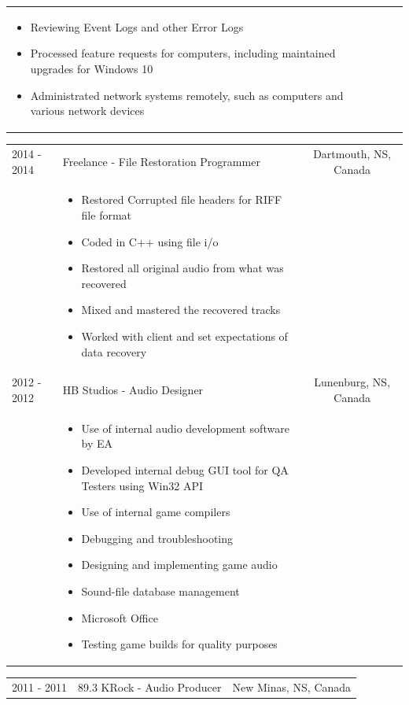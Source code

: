 \documentclass{res}
\newcommand{\frstCVcell}{2.5cm}
\begin{document}
\begin{resume}
\begin{tabularx}{\textwidth}{p{\frstCVcell}Xc}
\begin{itemize}
    \item Reviewing Event Logs and other Error Logs
    \item Processed feature requests for computers, including maintained upgrades for Windows 10
    \item Administrated network systems remotely, such as computers and various network devices
    \end{itemize}
    & \\
    \end{tabularx}
    \begin{tabularx}{\textwidth}{p{\frstCVcell}Xc}
    2014 - 2014 & Freelance - File Restoration Programmer & Dartmouth, NS, Canada\\
    &
    \begin{itemize}
    \item Restored Corrupted file headers for RIFF file format
    \item Coded in C++ using file i/o
    \item Restored all original audio from what was recovered
    \item Mixed and mastered the recovered tracks
    \item Worked with client and set expectations of data recovery
    \end{itemize}
    & \\
    2012 - 2012 & HB Studios - Audio Designer & Lunenburg, NS, Canada\\
    &
    \begin{itemize}
    \item Use of internal audio development software by EA
    \item Developed internal debug GUI tool for QA Testers using Win32 API
    \item Use of internal game compilers
    \item Debugging and troubleshooting
    \item Designing and implementing game audio
    \item Sound-file database management
    \item Microsoft Office
    \item Testing game builds for quality purposes
    \end{itemize}
    & \\
    \end{tabularx}
    \begin{tabularx}{\textwidth}{p{\frstCVcell}Xc}
    2011 - 2011 & 89.3 KRock - Audio Producer & New Minas, NS, Canada\\

\end{tabularx}
\end{resume}
\end{document}
